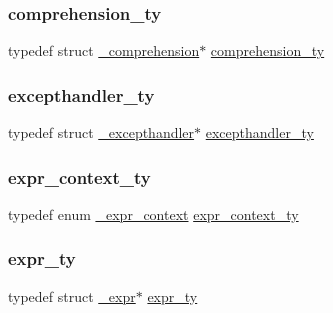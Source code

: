 \mbox{\label{_python-ast_8h_a465095ed82e25892d2ed2515ddfce38d}} 
\subsubsection{\texorpdfstring{comprehension\_ty}{comprehension\_ty}}
{\footnotesize\ttfamily typedef struct \mbox{\hyperlink{struct__comprehension}{\+\_\+comprehension}}$\ast$ \mbox{\hyperlink{_python-ast_8h_a465095ed82e25892d2ed2515ddfce38d}{comprehension\+\_\+ty}}}

\mbox{\label{_python-ast_8h_af85359ef2251f8c9819960684e134dfb}} 
\subsubsection{\texorpdfstring{excepthandler\_ty}{excepthandler\_ty}}
{\footnotesize\ttfamily typedef struct \mbox{\hyperlink{struct__excepthandler}{\+\_\+excepthandler}}$\ast$ \mbox{\hyperlink{_python-ast_8h_af85359ef2251f8c9819960684e134dfb}{excepthandler\+\_\+ty}}}

\mbox{\label{_python-ast_8h_a38710ce394ed6d5cc8ebe79a322dcdf9}} 
\subsubsection{\texorpdfstring{expr\_context\_ty}{expr\_context\_ty}}
{\footnotesize\ttfamily typedef enum \mbox{\hyperlink{_python-ast_8h_a7cc9da6a6307ea8052f27a18bd3d7d5b}{\+\_\+expr\+\_\+context}}  \mbox{\hyperlink{_python-ast_8h_a38710ce394ed6d5cc8ebe79a322dcdf9}{expr\+\_\+context\+\_\+ty}}}

\mbox{\label{_python-ast_8h_a56d3705e020a071405094a220c4592bd}} 
\subsubsection{\texorpdfstring{expr\_ty}{expr\_ty}}
{\footnotesize\ttfamily typedef struct \mbox{\hyperlink{struct__expr}{\+\_\+expr}}$\ast$ \mbox{\hyperlink{_python-ast_8h_a56d3705e020a071405094a220c4592bd}{expr\+\_\+ty}}}

